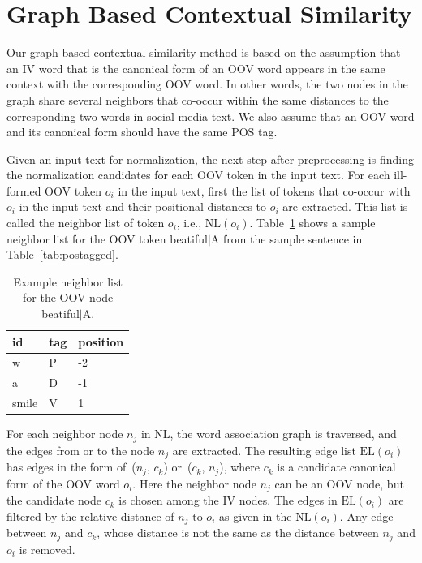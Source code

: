 \documentclass[a4paper,onesided,12pt]{report}
\begin{document}
\section{Graph Based Contextual Similarity}

Our graph based contextual similarity method is based on the assumption that an IV word that is the canonical form of an OOV word appears in the same context with the corresponding OOV word. In other words, the two nodes in the graph share several neighbors that co-occur within the same distances to the corresponding two words in social media text. We also assume that an OOV word and its canonical form should have the same POS tag.

Given an input text for normalization, the next step after preprocessing is finding the normalization candidates for each OOV token in the input text. For each ill-formed OOV token $o_i$ in the input text, first the list of tokens that co-occur with $o_i$ in the input text and their positional distances to $o_i$ are extracted.  This list is called the neighbor list of token $o_i$, i.e.,  $\text{NL}(o_i)$. Table~\ref{tab:neigh} shows a sample neighbor list for the OOV token beatiful$|$A from the sample sentence in Table~\ref{tab:postagged}.

\begin{table}[hbt]
\caption{Example neighbor list for the OOV node beatiful$|$A.}
\centering
\begin{tabular}{|l|l|l|}
    \hline
    \textbf{id} & \textbf{tag} & \textbf{position} \\
    \hline
    w & P & -2 \\     \hline
    a & D & -1 \\     \hline
    smile & V & 1 \\     \hline
  \end{tabular}
\label{tab:neigh}
\end{table}

For each neighbor node $n_{j}$ in $\text{NL}$, the word association graph is traversed, and the edges from or to the node $n_{j}$ are extracted. The resulting edge list $\text{EL}(o_i)$ has edges in the form of~($n_{j}$, $c_{k}$) or~($c_{k}$, $n_{j}$), where $c_{k}$ is a candidate canonical form of the OOV word $o_i$.
Here the neighbor node $n_{j}$ can be an OOV node, but the candidate node $c_{k}$ is chosen among the IV nodes.
The edges in $\text{EL}(o_i)$ are filtered by the relative distance of $n_{j}$ to $o_i$ as given in the $\text{NL}(o_i)$. Any edge between  $n_{j}$ and $c_{k}$, whose distance is not the same as the distance between $n_{j}$ and $o_i$ is removed.
\end{document}

